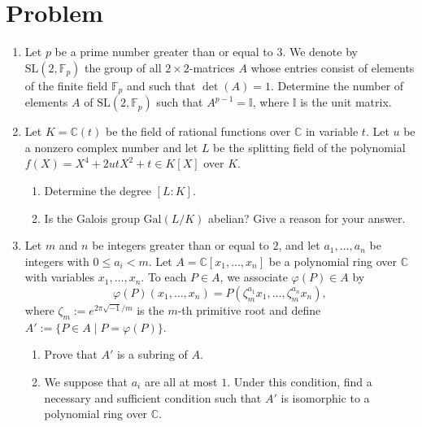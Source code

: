 \documentclass[10pt,a4paper]{article}
\begin{document}
\section*{Problem}
\begin{enumerate}[label=\fbox{\arabic*}]
  \item %
        Let $p$ be a prime number greater than or equal to $3$. We denote by $\mathrm{SL}(2, \mathbb{F}_p)$ the group of all $2 \times 2$-matrices $A$ whose entries consist of elements of the finite field $\mathbb{F}_p$ and such that $\det(A) = 1$. Determine the number of elements $A$ of $\mathrm{SL}(2, \mathbb{F}_p)$ such that $A^{p-1} = \mathbb{I}$, where $\mathbb{I}$ is the unit matrix.

  \item %
        Let $K = \mathbb{C}(t)$ be the field of rational functions over $\mathbb{C}$ in variable $t$. Let $u$ be a nonzero complex number and let $L$ be the splitting field of the polynomial $f(X) = X^4 + 2utX^2 + t \in K[X]$ over $K$.
        \begin{enumerate}[label=(\arabic*)]
          \item Determine the degree $[L : K]$.
          \item Is the Galois group $\mathrm{Gal}(L/K)$ abelian? Give a reason for your answer.
        \end{enumerate}

  \item %
        Let $m$ and $n$ be integers greater than or equal to $2$, and let $a_1, \dots, a_n$ be integers with $0 \le a_i < m$. Let $A = \mathbb{C}[x_1, \dots, x_n]$ be a polynomial ring over $\mathbb{C}$ with variables $x_1, \dots, x_n$. To each $P \in A$, we associate $\varphi(P) \in A$ by
        \[
          \varphi(P)(x_1, \dots, x_n) = P(\zeta_m^{a_1} x_1, \dots, \zeta_m^{a_n} x_n),
        \]
        where $\zeta_m := e^{2\pi\sqrt{-1}/m}$ is the $m$-th primitive root and define $A' := \{ P \in A \mid P = \varphi(P) \}$.
        \begin{enumerate}[label=(\arabic*)]
          \item Prove that $A'$ is a subring of $A$.
          \item We suppose that $a_i$ are all at most $1$. Under this condition, find a necessary and sufficient condition such that $A'$ is isomorphic to a polynomial ring over $\mathbb{C}$.
        \end{enumerate}


\end{enumerate}
\end{document}
